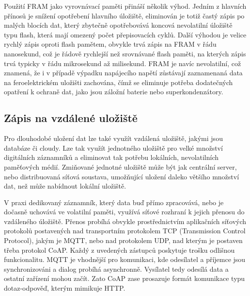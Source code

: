 Použití FRAM jako vyrovnávací paměti přináší několik výhod. Jedním z hlavních přínosů je snížení opotřebení hlavního úložiště, eliminován je totiž častý zápis po malých blocích dat, který zbytečně opotřebovává koncová nevolatilní úložiště typu flash, která mají omezený počet přepisovacích cyklů. Další výhodou je velice rychlý zápis oproti flash pamětem, obvykle trvá zápis na FRAM v řádu nanosekund, což je řádově rychlejší než srovnávané flash paměti, na kterých zápis trvá typicky v řádu mikrosekund až milisekund. FRAM je navíc nevolatilní, což znamená, že i v případě výpadku napájecího napětí zůstávají zaznamenaná data na feroelektrickém uložišti zachována, čímž se eliminuje potřeba dodatečných opatření k ochraně dat, jako jsou záložní baterie nebo superkondenzátory.

\subsection{Zápis na vzdálené uložiště}
\label{zapis_na_vzdalene_uloziste}
Pro dlouhodobé uložení dat lze také využít vzdálená uložiště, jakými jsou databáze či cloudy. Lze tak využít jednotného uložiště pro velké množství digitálních záznamníků a eliminovat tak potřebu lokálních, nevolatilních paměťových médií. Zmiňované jednotné uložiště může být jak centrální server, nebo distribuovaná síťová soustava, umožňující uložení daleko většího množství dat, než může nabídnout lokální uložiště.

V praxi dedikovaný záznamník, který data buď přímo zpracovává, nebo je dočasně uchovává ve volatilní paměti, využívá síťové rozhraní k jejich přenosu do vzdáleného úložiště. Přenos probíhá obvykle prostřednictvím aplikačních síťových protokolů postavených nad transportním protokolem TCP (Transmission Control Protocol), jakým je MQTT, nebo nad protokolem UDP, nad kterým je postaven třeba protokol CoAP. Každý z uvedených zástupců poskytuje trošku odlišnou funkcionalitu. MQTT je vhodnější pro komunikaci, kde odesílatel a příjemce jsou synchronizováni a dialog probíhá asynchronně. Vysílatel tedy odesílá data a ostatní zařízení mohou začít. Zato CoAP zase prosazuje formát komunikace typu dotaz-odpověď, kterým mimikuje HTTP. \cite{emq_mqtt_vs_coap}


